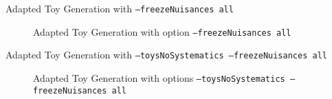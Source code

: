 \begin{frame}{Adapted Toy Generation with \texttt{--freezeNuisances all}}
\begin{figure}
\centering
{}
\caption[Adapted Toy Generation with option \texttt{--freezeNuisances all}]{Adapted Toy Generation with option \texttt{--freezeNuisances all}}
\end{figure}
\end{frame}

\begin{frame}{Adapted Toy Generation with \texttt{--toysNoSystematics --freezeNuisances all}}
\begin{figure}
\centering
{}
\caption[Adapted Toy Generation with options \texttt{--toysNoSystematics --freezeNuisances all}]{Adapted Toy Generation with options \texttt{--toysNoSystematics --freezeNuisances all}}
\end{figure}
\end{frame}
